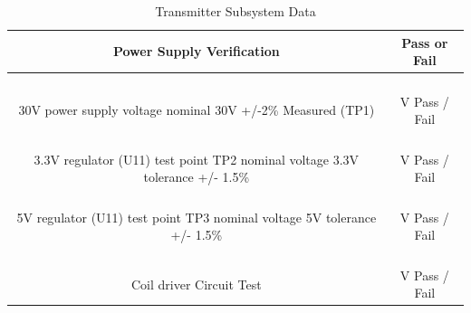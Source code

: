 \documentclass[12pt]{article}
\begin{document}
\begin{appendices}
\begin{table}[h!]
\centering
\caption*{Transmitter Subsystem Data}
\begin{tabular}{ | c | c | }
\hline
\textbf{Power Supply Verification} & \textbf{Pass or Fail} \\
\hline
\parbox{0.5\linewidth}{\raggedright \hfill \\[-0.25 em]
30V power supply voltage nominal 30V +/-2\% Measured (TP1) \hfill \\[0.1 em]
} &  \parbox{0.4\linewidth}{\raggedright \hfill \\ [0.7 em]
\underline{\hspace{0.625in}} V  \hspace{0.125 in}Pass \space / \space  Fail \hfill \\ [0.3 em]
} \\
\hline
\parbox{0.5\linewidth}{\raggedright \hfill \\[-0.25 em]
3.3V regulator (U11) test point TP2 nominal voltage 3.3V  tolerance +/- 1.5\% \hfill \\[0.1 em]
} &  \parbox{0.4\linewidth}{\raggedright \hfill \\ [0.7 em]
\underline{\hspace{0.625in}} V  \hspace{0.125 in}Pass \space / \space  Fail \hfill \\ [0.3 em]
} \\
\hline
\parbox{0.5\linewidth}{\raggedright \hfill \\[-0.25 em]
5V regulator (U11) test point TP3 nominal voltage 5V  tolerance +/- 1.5\% \hfill \\[0.1 em]
} &  \parbox{0.4\linewidth}{\raggedright \hfill \\ [0.7 em]
\underline{\hspace{0.625in}} V  \hspace{0.125 in}Pass \space / \space  Fail \hfill \\ [0.3 em]
} \\ 
\hline
\parbox{0.5\linewidth}{\raggedright \hfill \\[-0.25 em]
Coil driver Circuit Test \hfill \\[0.1 em]
} &  \parbox{0.4\linewidth}{\raggedright \hfill \\ [0.7 em]
\underline{\hspace{0.625in}} V  \hspace{0.125 in}Pass \space / \space  Fail \hfill \\ [0.3 em]
} \\ 

\end{tabular}
\end{table}
\end{appendices}
\end{document}
